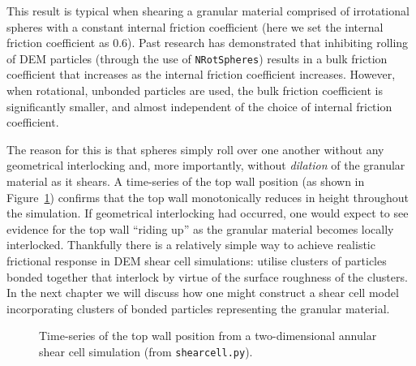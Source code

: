 This result is typical when shearing a granular material comprised of irrotational spheres with a constant internal friction coefficient (here we set the internal friction coefficient as $0.6$). Past research has demonstrated that inhibiting rolling of DEM particles (through the use of \texttt{NRotSpheres}) results in a bulk friction coefficient that increases as the internal friction coefficient increases. However, when rotational, unbonded particles are used, the bulk friction coefficient is significantly smaller, and almost independent of the choice of internal friction coefficient. 

The reason for this is that spheres simply roll over one another without any geometrical interlocking and, more importantly, without \emph{dilation} of the granular material as it shears. A time-series of the top wall position (as shown in Figure~\ref{fig:dilation}) confirms that the top wall monotonically reduces in height throughout the simulation. If geometrical interlocking had occurred, one would expect to see evidence for the top wall ``riding up'' as the granular material becomes locally interlocked.  Thankfully there is a relatively simple way to achieve realistic frictional response in DEM shear cell simulations: utilise clusters of particles bonded together that interlock by virtue of the surface roughness of the clusters. In the next chapter we will discuss how one might construct a shear cell model incorporating clusters of bonded particles representing the granular material. 

\begin{figure}
\begin{center}
\end{center}
\caption{Time-series of the top wall position from a two-dimensional annular shear cell simulation (from \texttt{shearcell.py}).} \label{fig:dilation}
\end{figure}

